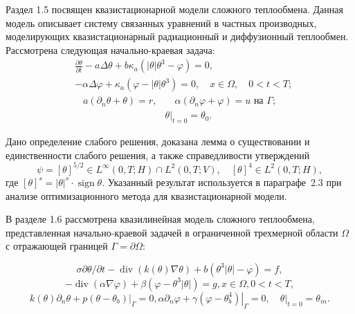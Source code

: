 Раздел 1.5 посвящен квазистационарной модели сложного теплообмена.
Данная модель описывает систему связанных уравнений в частных производных,
моделирующих квазистационарный радиационный и диффузионный теплообмен.
Рассмотрена следующая начально-краевая задача:
\begin{equation}
    \label{eq:1_5:1}
    \begin{split}
        & \frac{\partial \theta}{\partial t} - a \Delta \theta
        + b \kappa_{a} \left(|\theta| \theta^{3}-\varphi\right) = 0,\\
        & - \alpha \Delta \varphi
        + \kappa_{a} \left(\varphi-|\theta| \theta^{3}\right) = 0,
        \quad x \in \Omega, \quad 0 < t < T;
    \end{split}
\end{equation}
\begin{align}
    a \left(\partial_{n} \theta+\theta\right)=r,
    & \quad \alpha\left(\partial_{n} \varphi
    + \varphi\right) = u \text { на } \Gamma;  \label{eq:1_5:2}\\
    & \left.\theta\right|_{t=0} = \theta_{0}. \label{eq:1_5:3}
\end{align}



Дано определение слабого решения, доказана лемма о существовании и единственности
слабого решения, а также справедливости утверждений
\[
    \psi=[\theta]^{5 / 2} \in L^{\infty}(0, T ; H) \cap L^{2}(0, T ; V),
    \quad[\theta]^{4} \in L^{2}(0, T ; H),
\]
где $[\theta]^{s} = |\theta|^s \cdot \operatorname{sign} \theta$.
Указанный результат используется в параграфе~2.3 при анализе
оптимизационного метода для квазистационарной модели.

В разделе 1.6 рассмотрена квазилинейная модель сложного теплообмена,
представленная начально-краевой задачей в ограниченной трехмерной
области $\Omega$ с отражающей границей $\Gamma=\partial \Omega$:

\begin{equation}
    \label{eq:1_6:1}
    \sigma \partial \theta / \partial t
    -\operatorname{div}(k(\theta) \nabla \theta)
    +b\left(\theta^{3}|\theta|-\varphi\right)=f,
\end{equation}
\begin{equation}
    \label{eq:1_6:2}
    -\operatorname{div}(\alpha \nabla \varphi)
    +\beta\left(\varphi-\theta^{3}|\theta|\right)=g, x \in \Omega, 0<t<T,
\end{equation}
\begin{equation}
    \label{eq:1_6:3}
    k(\theta) \partial_{n} \theta+\left.p\left(\theta-\theta_{b}\right)\right|_{\Gamma}=0,
    \alpha \partial_{n} \varphi
    +\left.\gamma\left(\varphi-\theta_{b}^{4}\right)\right|_{\Gamma}=0,
    \left.\quad \theta\right|_{t=0}=\theta_{in}.
\end{equation}


